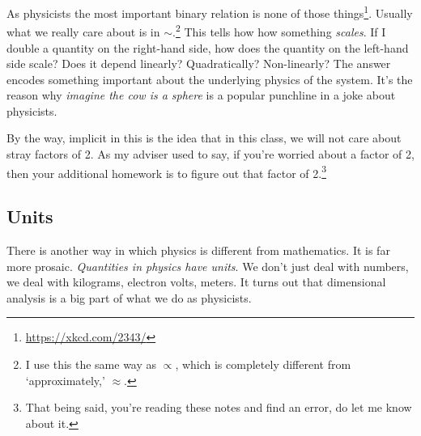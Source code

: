 As physicists the most important binary relation is none of those things\footnote{\url{https://xkcd.com/2343/}}. Usually what we really care about is in $\sim$.\footnote{I use this the same way as $\propto$, which is completely different from `approximately,’ $\approx$.} This tells how how something \emph{scales}. If I double a quantity on the right-hand side, how does the quantity on the left-hand side scale? Does it depend linearly? Quadratically? Non-linearly? The answer encodes something important about the underlying physics of the system. It's the reason why \emph{imagine the cow is a sphere} is a popular punchline in a joke about physicists. 


By the way, implicit in this is the idea that in this class, we will not care about stray factors of 2. As my adviser used to say, if you’re worried about a factor of 2, then your additional homework is to figure out that factor of 2.\footnote{That being said, you're reading these notes and find an error, do let me know about it.} 

\subsection{Units}

There is another way in which physics is different from mathematics. It is far more prosaic. \emph{Quantities in physics have units}. We don’t just deal with numbers, we deal with kilograms, electron volts, meters. It turns out that dimensional analysis is a big part of what we do as physicists. 

